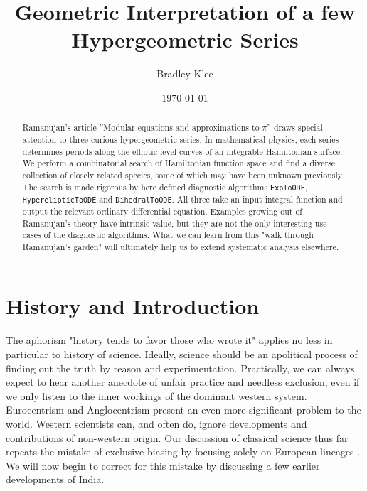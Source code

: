 \documentclass[nofootinbib,preprint]{revtex4-1}
\begin{document}
\title{Geometric Interpretation of a few Hypergeometric Series}
\author{Bradley Klee}

\date{\today}

\begin{abstract}
Ramanujan's article ''Modular equations and approximations to $\pi$'' draws special attention 
to three curious hypergeometric series. In mathematical physics, each series determines 
periods along the elliptic level curves of an integrable Hamiltonian surface. We perform a 
combinatorial search of Hamiltonian function space and find  a diverse collection of closely
related species, some of which may have been unknown previously. The search is made rigorous 
by here defined diagnostic algorithms \texttt{ExpToODE},
\texttt{HyperelipticToODE} and \texttt{DihedralToODE}. All three take an input integral 
function and output the relevant ordinary differential equation. Examples growing out of 
Ramanujan's theory have intrinsic value, but they are not the only interesting use cases of the 
diagnostic algorithms. What we can learn from this "walk through Ramanujan's garden" will 
ultimately help us to extend systematic analysis elsewhere.  
\end{abstract}

\maketitle 

\section{History and Introduction}
The aphorism "history tends to favor those who wrote it" applies no less in particular
to history of science. Ideally, science should be an apolitical process of finding out the 
truth by reason and experimentation. Practically, we can always expect to hear another 
anecdote of unfair practice and needless exclusion, even if we only listen to the inner 
workings of the dominant western system. Eurocentrism and Anglocentrism present an even
more significant problem to the world. Western scientists can, and often do, ignore developments and 
contributions of non-western origin. Our discussion of classical science thus far repeats 
the mistake of exclusive biasing by focusing solely on European lineages 
\cite{KLEE2020Prelude,KLEE2020Pendulum}. We will now begin 
to correct for this mistake by discussing a few earlier developments of India. 
\end{document}
